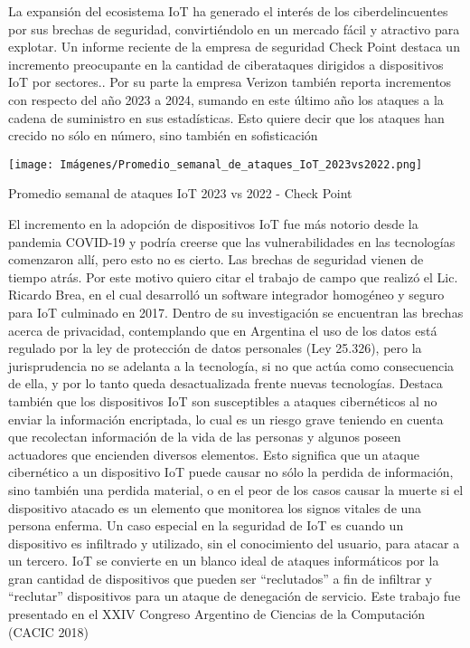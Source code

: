 La expansión del ecosistema IoT ha generado el interés de los ciberdelincuentes por sus brechas de seguridad, convirtiéndolo en un mercado fácil y atractivo para explotar. Un informe reciente de la empresa de seguridad Check Point destaca un incremento preocupante en la cantidad de ciberataques dirigidos a dispositivos IoT por sectores.\cite{checkpoint2023iot}. Por su parte la empresa Verizon también reporta incrementos con respecto del año 2023 a 2024, sumando en este último año los ataques a la cadena de suministro en sus estadísticas. Esto quiere decir que los ataques han crecido no sólo en número, sino también en sofisticación \cite{Verizon2023} \cite{Verizon2024} 

\begin{table}[ht]
    \centering
        \texttt{[image: Imágenes/Promedio\_semanal\_de\_ataques\_IoT\_2023vs2022.png]} 
    \caption{Promedio semanal de ataques IoT 2023 vs 2022 - Check Point}
    \label{tab:promedio_semanal_de_ataques_IoT_2023vs2022}
\end{table}

El incremento en la adopción de dispositivos IoT fue más notorio desde la pandemia COVID-19 y podría creerse que las vulnerabilidades en las tecnologías comenzaron allí, pero esto no es cierto. Las brechas de seguridad vienen de tiempo atrás. Por este motivo quiero citar el trabajo de campo que realizó el Lic. Ricardo Brea, en el cual desarrolló un software integrador homogéneo y seguro para IoT culminado en 2017. Dentro de su investigación se encuentran las brechas acerca de privacidad, contemplando que en Argentina el uso de los datos está regulado por la ley de protección de datos personales (Ley 25.326), pero la jurisprudencia no se adelanta a la tecnología, si no que actúa como consecuencia de ella, y por lo tanto queda desactualizada frente nuevas tecnologías. Destaca también que los dispositivos IoT son susceptibles a ataques cibernéticos al no enviar la información encriptada, lo cual es un riesgo grave teniendo en cuenta que recolectan información de la vida de las personas y algunos poseen actuadores que encienden diversos elementos. Esto significa que un ataque cibernético a un dispositivo IoT puede causar no sólo la perdida de información, sino también una perdida material, o en el peor de los casos causar la muerte si el dispositivo atacado es un elemento que monitorea los signos vitales de una persona enferma. Un caso especial en la seguridad de IoT es cuando un dispositivo es infiltrado y utilizado, sin el conocimiento del usuario, para atacar a un tercero. IoT se convierte en un blanco ideal de ataques informáticos por la gran cantidad de dispositivos que pueden ser “reclutados” a fin de infiltrar y “reclutar” dispositivos para un ataque de denegación de servicio. Este trabajo fue presentado en el XXIV Congreso Argentino de Ciencias de la Computación (CACIC 2018)\cite{brea2018hub}

